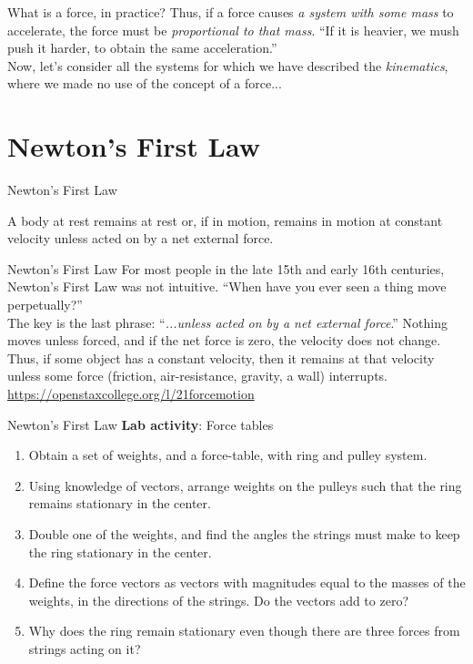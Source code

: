 \documentclass{beamer}
\begin{document}
\begin{frame}{What is a force, in practice?}
Thus, if a force causes \textit{a system with some mass} to accelerate, the force must be \textit{proportional to that mass}.  \alert{``If it is heavier, we mush push it harder, to obtain the same acceleration.''}  \\
\vspace{1cm}
Now, let's consider all the systems for which we have described the \textit{kinematics}, where we made no use of the concept of a force...
\end{frame}

\section{Newton's First Law}

\begin{frame}{Newton's First Law}
\begin{tcolorbox}[colback=white,colframe=red!40!blue,title=Newton's First Law]
\alert{A body at rest remains at rest or, if in motion, remains in motion at constant velocity unless acted on by a net external force.}
\end{tcolorbox}
\end{frame}

\begin{frame}{Newton's First Law}
\small
For most people in the late 15th and early 16th centuries, Newton's First Law was not intuitive.  ``When have you ever seen a thing move perpetually?''\\
\vspace{0.5cm}
The key is the last phrase: ``\textit{...unless acted on by a \alert{net} external force}.''  Nothing moves unless forced, and if the \alert{net} force is zero, the velocity does not change.  Thus, if some object has a constant velocity, then it remains at that velocity unless some force (friction, air-resistance, gravity, a wall) interrupts. \\
\vspace{0.5cm}
\url{https://openstaxcollege.org/l/21forcemotion}
\end{frame}

\begin{frame}{Newton's First Law}
\small
\textbf{Lab activity}: Force tables
\begin{enumerate}
\item Obtain a set of weights, and a force-table, with ring and pulley system.
\item Using knowledge of vectors, arrange weights on the pulleys such that the ring remains stationary in the center.
\item Double one of the weights, and find the angles the strings must make to keep the ring stationary in the center.
\item Define the force vectors as vectors with magnitudes equal to the masses of the weights, in the directions of the strings.  Do the vectors add to zero?
\item Why does the ring remain stationary even though there are three forces from strings acting on it?
\end{enumerate}
\end{frame}
\end{document}
